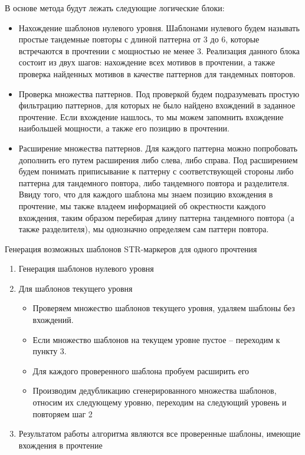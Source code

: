 В основе метода будут лежать следующие логические блоки:
\begin{itemize}
\item Нахождение шаблонов нулевого уровня. Шаблонами нулевого будем называть простые тандемные
повторы с длиной паттерна от 3 до 6, которые встречаются в прочтении с мощностью не менее 3.
Реализация данного блока состоит из двух шагов: нахождение всех мотивов в прочтении, а также
проверка найденных мотивов в качестве паттернов для тандемных повторов.

\item Проверка множества паттернов. Под проверкой будем подразумевать простую фильтрацию паттернов,
для которых не было найдено вхождений в заданное прочтение. Если вхождение нашлось,
то мы можем запомнить вхождение наибольшей мощности, а также его позицию в прочтении.

\item Расширение множества паттернов. Для каждого паттерна можно попробовать дополнить его
путем расширения либо слева, либо справа. Под расширением будем понимать приписывание к паттерну с соответствующей
стороны либо паттерна для тандемного повтора, либо тандемного повтора и разделителя.
Ввиду того, что для каждого шаблона мы знаем позицию вхождения в прочтение,
мы также владеем информацией об окрестности каждого вхождения, таким образом перебирая
длину паттерна тандемного повтора (а также разделителя), мы однозначно определяем сам
паттерн повтора.
\end{itemize}

\Algorithm Генерация возможных шаблонов STR-маркеров для одного прочтения
\begin{enumerate}
  \item Генерация шаблонов нулевого уровня
  \item Для шаблонов текущего уровня
  \begin{itemize}
    \item Проверяем множество шаблонов текущего уровня, удаляем шаблоны без вхождений.
    \item Если множество шаблонов на текущем уровне пустое -- переходим к пункту 3.
    \item Для каждого проверенного шаблона пробуем расширить его
    \item Производим дедубликацию сгенерированного множества шаблонов, относим их следующему уровню,
     переходим на следующий уровень и повторяем шаг 2
  \end{itemize}
  \item Результатом работы алгоритма являются все проверенные шаблоны, имеющие вхождения в прочтение
\end{enumerate}

